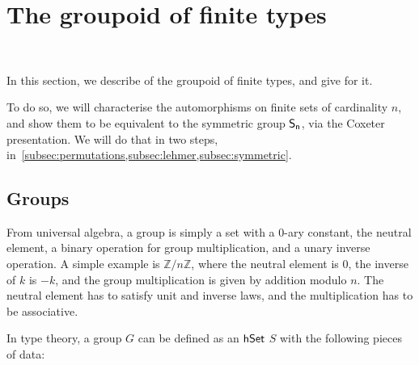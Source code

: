 \section{The groupoid of finite types}~\label{sec:finite}

In this section, we describe  of the groupoid of
finite types, and give  for it.



To do so, we will characterise the automorphisms on finite sets of cardinality
$n$, and show them to be equivalent to the symmetric group $\Sn$, via the
Coxeter presentation. We will do that in two steps,
in~\cref*{subsec:permutations,subsec:lehmer,subsec:symmetric}.



\subsection{Groups}

From universal algebra, a group is simply a set with a 0-ary constant, the neutral element, a binary operation for group
multiplication, and a unary inverse operation. A simple example is $\mathbb{Z}/n\mathbb{Z}$, where the neutral element
is 0, the inverse of $k$ is $-k$, and the group multiplication is given by addition modulo $n$. The neutral element has
to satisfy unit and inverse laws, and the multiplication has to be associative.

In type theory, a group $G$ can be defined as an $\mathsf{hSet}$ $S$ with the following pieces of data:

